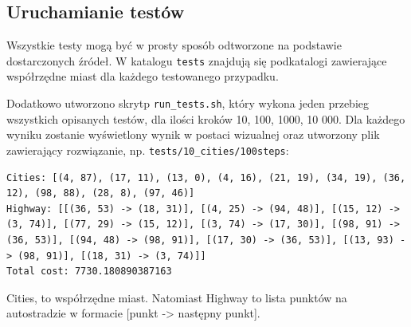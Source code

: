 \documentclass[a4paper]{article}
\begin{document}
\subsection{Uruchamianie testów}

Wszystkie testy mogą być w prosty sposób odtworzone na podstawie dostarczonych źródeł. W katalogu \texttt{tests} znajdują się podkatalogi zawierające współrzędne miast dla każdego testowanego przypadku. 

Dodatkowo utworzono skrytp \texttt{run\_tests.sh}, który wykona jeden przebieg wszystkich opisanych testów, dla ilości kroków 10, 100, 1000, 10 000. Dla każdego wyniku zostanie wyświetlony wynik w postaci wizualnej oraz utworzony plik zawierający rozwiązanie, np. \texttt{tests/10\_cities/100steps}:
\begin{lstlisting}[basicstyle=\ttfamily\selectfont\footnotesize]
Cities: [(4, 87), (17, 11), (13, 0), (4, 16), (21, 19), (34, 19), (36, 12), (98, 88), (28, 8), (97, 46)]
Highway: [[(36, 53) -> (18, 31)], [(4, 25) -> (94, 48)], [(15, 12) -> (3, 74)], [(77, 29) -> (15, 12)], [(3, 74) -> (17, 30)], [(98, 91) -> (36, 53)], [(94, 48) -> (98, 91)], [(17, 30) -> (36, 53)], [(13, 93) -> (98, 91)], [(18, 31) -> (3, 74)]]
Total cost: 7730.180890387163
\end{lstlisting}

Cities, to współrzędne miast. Natomiast Highway to lista punktów na autostradzie w formacie [punkt -> następny punkt].
\end{document}
